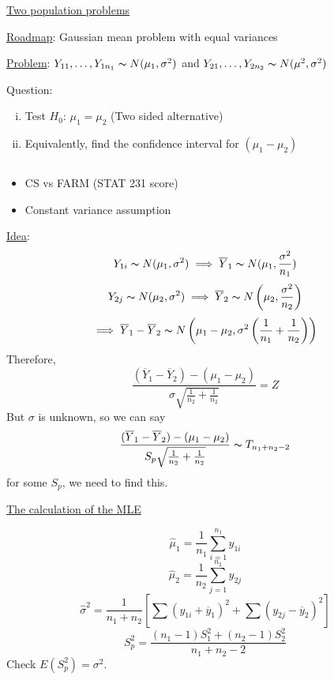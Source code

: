 \underline{Two population problems}

\underline{Roadmap}: Gaussian mean problem with equal variances

\underline{Problem}: $ Y_{11},\ldots ,Y_{1n_1} \thicksim N(\mu_1,\sigma^2) $ and
$ Y_{21},\ldots ,Y_{2n_2} \thicksim N(\mu^2,\sigma^2) $

Question:
\begin{enumerate}[(i)]
    \item Test $ H_0 $: $ \mu_1=\mu_2 $ (Two sided alternative)
    \item Equivalently, find the confidence interval for $ (\mu_1-\mu_2) $
\end{enumerate}

\begin{exbox}
    \begin{example} $ \; $
        \begin{itemize}
            \item CS vs FARM (STAT 231 score)
            \item Constant variance assumption
        \end{itemize}
    \end{example}
\end{exbox}

\underline{Idea}:
\[ Y_{1i} \thicksim N(\mu_1,\sigma^2)\implies \overline{Y}_1 \thicksim N(\mu_1,\frac{\sigma^2}{n_1} ) \]
\[ Y_{2j} \thicksim N(\mu_2,\sigma^2)\implies \overline{Y}_2 \thicksim N\left( \mu_2,\frac{\sigma^2}{n_2} \right) \]
\[ \implies \overline{Y}_1-\overline{Y}_2
    \thicksim N\left(\mu_1-\mu_2,\sigma^2\left( \frac{1}{n_1} +\frac{1}{n_2} \right)\right) \]
Therefore,
\[ \frac{(\overline{Y}_1-\overline{Y}_2)-(\mu_1-\mu_2)}{\sigma \sqrt{\frac{1}{n_2}+\frac{1}{n_2}}}=Z  \]
But $ \sigma $ is unknown, so we can say
\[ \frac{(\overline{Y}_1-\overline{Y}_2)-(\mu_1-\mu_2)}{S_p\sqrt{\frac{1}{n_2}+\frac{1}{n_2}}}
    \thicksim T_{n_1+n_2-2} \]
for some $ S_p $, we need to find this.

\underline{The calculation of the MLE}

\[ \hat{\mu}_1=\frac{1}{n_1} \sum\limits_{i=1}^{n_1} y_{1i} \]
\[ \hat{\mu}_2=\frac{1}{n_2} \sum\limits_{j=1}^{n_2} y_{2j} \]
\[ \hat{\sigma}^2=\frac{1}{n_1+n_2}\left[ \sum(y_{1i}+\overline{y}_1)^2+ \sum(y_{2j}-\overline{y}_2)^2\right] \]
\[ S_p^2=\frac{(n_1-1)S_1^2+(n_2-1)S_2^2}{n_1+n_2-2} \]
Check $ E(S_p^2)=\sigma^2 $.

